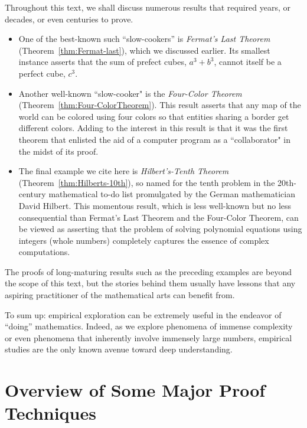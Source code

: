 \smallskip

Throughout this text, we shall discuss numerous results that required years, or decades, or even centuries to prove.
\begin{itemize}
\item
One of the best-known such ``slow-cookers'' is {\it Fermat's Last Theorem} (Theorem~\ref{thm:Fermat-last}), which we discussed earlier.  Its smallest instance asserts that the sum of prefect cubes, $a^3 + b^3$, cannot itself be a perfect cube, $c^3$.
\medskip\item
Another well-known ``slow-cooker" is the {\it Four-Color Theorem}
(Theorem~\ref{thm:Four-ColorTheorem}).  This result asserts that any map of the world can be colored using four colors so that entities sharing a border get different colors.  Adding to the interest in this result is that it was the first theorem that enlisted the aid of a computer program as a ``collaborator" in the midst of its proof.
\medskip\item
The final example we cite here is {\it Hilbert's-Tenth Theorem} (Theorem~\ref{thm:Hilberts-10th}), so named for the tenth problem in the 20th-century mathematical to-do list promulgated by the German mathematician David Hilbert.  This momentous result, which is less well-known but no less consequential than Fermat's Last Theorem and the Four-Color Theorem, can be viewed as asserting that the problem of solving polynomial equations using integers (whole numbers) completely captures the essence of complex computations.
  
\end{itemize}
The proofs of long-maturing results such as the preceding examples are beyond the scope of this text, but the stories behind them usually have lessons that any aspiring practitioner of the mathematical arts can benefit from.

\smallskip

To sum up: empirical exploration can be extremely useful in the endeavor of ``doing'' mathematics.  Indeed, as we explore phenomena of immense complexity or even phenomena that inherently involve immensely large numbers, empirical studies are the only known avenue toward deep understanding.


\section{Overview of Some Major Proof Techniques}
\label{sec:major-proof-techniques}

